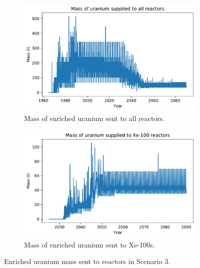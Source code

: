 \begin{figure}
    \centering
    \begin{subfigure}{0.45\textwidth}
        \centering
        \includegraphics[scale=0.4]{../figures/fuelsupply_scenarios_3.pdf}
        \caption{Mass of enriched uranium sent to all reactors.}
        \label{fig:totalfuel_3}
    \end{subfigure}
    \hspace{0.8cm}
    \begin{subfigure}{0.45\textwidth}
        \centering
        \includegraphics[scale=0.4]{../figures/advancedRX_fuelsupply_scenarios_3.pdf}
        \caption{Mass of enriched uranium sent to Xe-100s.}
        \label{fig:haleu_3}
    \end{subfigure}
    \caption{Enriched uranium mass sent to reactors in Scenario 3.}
    \label{fig:fuel_3}
\end{figure}

